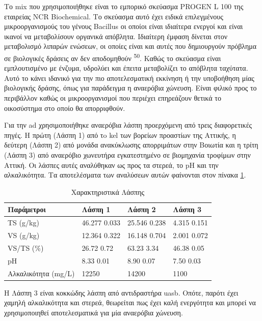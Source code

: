 \documentclass[11pt]{report}
\makeatletter
\newcommand{\citeprocitem}[2]{\hyper@linkstart{cite}{citeproc_bib_item_#1}#2\hyper@linkend}
\makeatother
\begin{document}
Το \acrfull{mix} που χρησιμοποιήθηκε είναι το εμπορικό σκεύασμα PROGEN L 100 της εταιρείας NCR Biochemical. Το σκεύασμα αυτό έχει ειδικά επιλεγμένους μικροοργανισμούς του γένους Bacillus οι οποίοι είναι ιδιαίτερα ενεργοί και είναι ικανοί να μεταβολίσουν οργανικά απόβλητα. Ιδιαίτερη έμφαση δίνεται στον μεταβολισμό λιπαρών ενώσεων, οι οποίες είναι και αυτές που δημιουργούν πρόβλημα σε βιολογικές δράσεις αν δεν αποδομηθούν \textsuperscript{\citeprocitem{50}{50}}. Καθώς το σκεύασμα είναι εμπλουτισμένο με ένζυμα, υδρολύει και έπειτα μεταβολίζει το απόβλητα ταχύτατα. Αυτό το κάνει ιδανικό για την πιο αποτελεσματική εκκίνηση ή την υποβοήθηση μίας βιολογικής δράσης, όπως για παράδειγμα η αναερόβια χώνευση. Είναι φιλικό προς το περιβάλλον καθώς οι μικροοργανισμοί που περιέχει επηρεάζουν θετικά το οικοσύστημα στο οποίο θα απορριφθούν.

Για την \acrshort{ad} χρησιμοποιήθηκε αναερόβια λάσπη προερχόμενη από τρεις διαφορετικές πηγές. Η πρώτη (Λάσπη 1) από τo \acrfull{kel} των βορείων προαστίων της Αττικής, η δεύτερη (Λάσπη 2) από μονάδα ανακύκλωσης απορριμάτων στην Βοιωτία και η τρίτη (Λάσπη 3) από αναερόβιο χωνευτήρα εγκατεστημένο σε βιομηχανία τροφίμων στην Αττική. Οι λάσπες αυτές αναλύθηκαν ως προς τα στερεά, το pH και την αλκαλικότητα. Τα αποτελέσματα των αναλύσεων αυτών φαίνονται στον πίνακα \ref{tab:org7d43004}. 

\begin{table}[htbp]
\caption{\label{tab:org7d43004}Χαρακτηριστικά Λάσπης}
\centering
\begin{tabular}{llll}
Παράμετροι & Λάσπη 1 & Λάσπη 2 & Λάσπη 3\\[0pt]
\hline
TS (g/kg) & 46.277 \textpm{} 0.033 & 25.546 \textpm{} 0.238 & 4.315 \textpm{} 0.151\\[0pt]
VS (g/kg) & 12.364 \textpm{} 0.322 & 16.148 \textpm{} 0.704 & 2.001 \textpm{} 0.072\\[0pt]
VS/TS (\%) & 26.72 \textpm{} 0.72 & 63.23 \textpm{} 3.34 & 46.38 \textpm{} 0.05\\[0pt]
pH & 8.33 \textpm{} 0.01 & 8.90 \textpm{} 0.07 & 7.50 \textpm{} 0.03\\[0pt]
Αλκαλικότητα (mg/L) & 12250 & 14200 & 1100\\[0pt]
\end{tabular}
\end{table}

Η Λάσπη 3 είναι κοκκώδης λάσπη από αντιδραστήρα \acrshort{uasb}. Οπότε, παρότι έχει χαμηλή αλκαλικότητα και στερεά, θεωρείται πως έχει καλή ενεργότητα και μπορεί να χρησιμοποιηθεί αποτελεσματικά για μία αναερόβια χώνευση.
\end{document}

